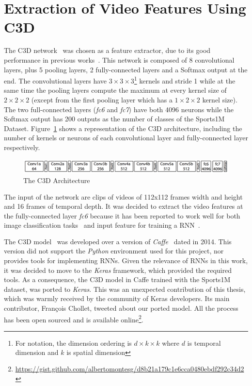 \section{Extraction of Video Features Using C3D}

The C3D network~\cite{tran2014learning} was chosen as a feature extractor, due to its good performance in previous works~\cite{baccouche2011sequential,tran2015deep,tran2014learning,shoutemporal}. This network is composed of 8 convolutional layers, plus 5 pooling layers, 2 fully-connected layers and a Softmax output at the end.
The convolutional layers have $3 \times 3 \times 3$\footnote{For notation, the dimension ordering is $d \times k \times k$ where $d$ is temporal dimension and $k$ is spatial dimension} kernels and stride 1 while at the same time the pooling layers compute the maximum at every kernel size of $2 \times 2 \times 2$ (except from the first pooling layer which has a $1 \times 2 \times 2$ kernel size).
The two full-connected layers (\textit{fc6} and \textit{fc7}) have both 4096 neurons while the Softmax output has 200 outputs as the number of classes of the Sports1M Dataset. Figure~\ref{fig:c3d_architecture} shows a representation of the C3D architecture, including the number of kernels or neurons of each convolutional layer and fully-connected layer respectively.

\begin{figure}[H]
\begin{center}
\includegraphics[width=1\linewidth]{img/methodology/c3d_architecture}
\end{center}
\caption{The C3D Architecture}
\label{fig:c3d_architecture}
\end{figure}

The input of the network are clips of videos of 112x112 frames width and height and 16 frames of temporal depth. It was decided to extract the video features at the fully-connected layer \textit{fc6} because it has been reported to work well for both image classification tasks~\cite{girshick2014rich} and input feature for training a RNN~\cite{donahue2015long}.

The C3D model~\cite{tran2014learning} was developed over a version of \textit{Caffe}~\cite{jia2014caffe} dated in 2014. This version did not support the \textit{Python} environment used for this project, nor provides tools for implementing RNNs. Given the relevance of RNNs in this work, it was decided to move to the \textit{Keras} framework, which provided the required tools. As a consequence, the C3D model in Caffe trained with the Sports1M~\cite{KarpathyCVPR14} dataset, was ported to \textit{Keras}.
This was an unexpected contribution of this thesis, which was warmly received by the community of Keras developers. Its main contributor, François Chollet, tweeted about our ported model. All the process has been open sourced and is available online\footnote{ \url{https://gist.github.com/albertomontesg/d8b21a179c1e6cca0480ebdf292c34d2}}.

